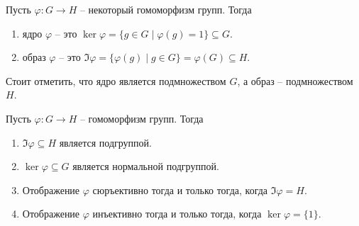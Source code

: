 \begin{definition}
Пусть $\varphi\colon G\to H$ -- некоторый гомоморфизм групп.
Тогда
\begin{enumerate}
\item ядро $\varphi$ -- это $\ker \varphi = \{g\in G \mid \varphi(g) = 1\} \subseteq G$.

\item образ $\varphi$ -- это $\Im \varphi = \{\varphi(g)\mid g\in G\} = \varphi(G) \subseteq H$.
\end{enumerate}
\end{definition}

Стоит отметить, что ядро является подмножеством $G$, а образ -- подмножеством $H$.

\begin{claim}
\label{claim::HomProp}
Пусть $\varphi\colon G\to H$ -- гомоморфизм групп.
Тогда
\begin{enumerate}
\item $\Im \varphi \subseteq H$  является подгруппой.

\item $\ker \varphi \subseteq G$ является нормальной подгруппой.

\item Отображение $\varphi$ сюръективно тогда и только тогда, когда $\Im \varphi = H$.

\item Отображение $\varphi$ инъективно тогда и только тогда, когда $\ker \varphi  = \{1\}$.
\end{enumerate}
\end{claim}

